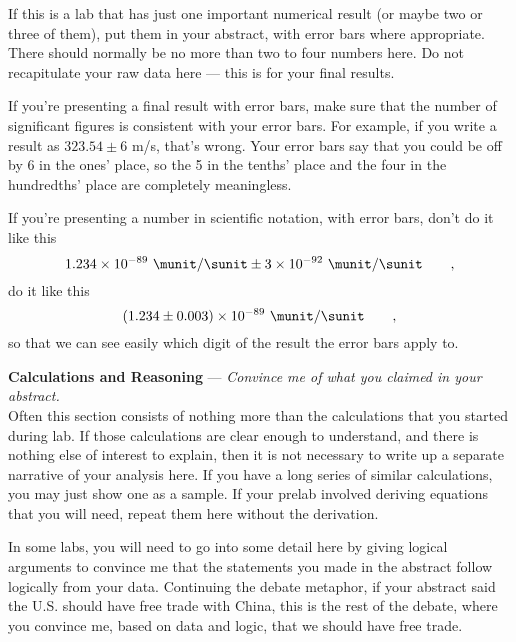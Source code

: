 If this is a lab that has just one important numerical result (or
maybe two or three of them), put them
in your abstract, with error
bars where appropriate. There should normally be no more
than two to four numbers here. Do not recapitulate your raw
data here --- this is for your final results.

If you're presenting a final result with error bars, make sure that
the number of significant figures is consistent with your error bars.
For example, if you write a result as $323.54\pm6$ m/s, that's wrong.
Your error bars say that you could be off by 6 in the ones' place, so the
5 in the tenths' place and the four in the hundredths' place are
completely meaningless.

If you're presenting a number in scientific notation, with error bars,
don't do it like this
\begin{equation*}
  1.234 \times 10^{-89}\ \munit/\sunit \pm 3 \times 10^{-92}\ \munit/\sunit \qquad ,
\end{equation*}
do it like this
\begin{equation*}
  (1.234 \pm 0.003)\times 10^{-89}\ \munit/\sunit \qquad ,
\end{equation*}
so that we can see easily which digit of the result the error bars apply
to.

\textbf{Calculations and Reasoning}  --- \emph{Convince me of
what you claimed in your abstract.}\\
Often this section consists of nothing more than the calculations
that you started during lab. If those calculations are clear enough
to understand, and there is nothing else of interest to explain,
then it is not necessary to write up a separate
narrative of your analysis here.
If you have a long series of similar calculations,
you may just show one as a sample. If your prelab involved
deriving equations that you will need, repeat them here
without the derivation. 

In some labs, you will need to go into some detail here by giving
logical arguments to convince me that the statements you made
in the abstract follow logically from
your data. Continuing the debate meta\-phor, if your abstract
said the U.S. should have free trade with China, this is the rest
of the debate, where you convince me, based on data and logic,
that we should have free trade.
